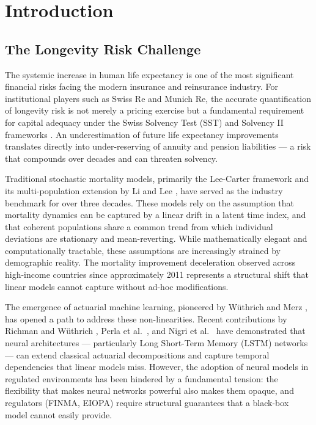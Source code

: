 \documentclass[11pt,a4paper]{article}
\begin{document}

\section{Introduction}

\subsection{The Longevity Risk Challenge}

The systemic increase in human life expectancy is one of the most significant financial risks facing the modern insurance and reinsurance industry. For institutional players such as Swiss Re and Munich Re, the accurate quantification of longevity risk is not merely a pricing exercise but a fundamental requirement for capital adequacy under the Swiss Solvency Test (SST) and Solvency II frameworks \cite{swissre2022}. An underestimation of future life expectancy improvements translates directly into under-reserving of annuity and pension liabilities --- a risk that compounds over decades and can threaten solvency.

Traditional stochastic mortality models, primarily the Lee-Carter framework \cite{leecarter1992} and its multi-population extension by Li and Lee \cite{lilee2005}, have served as the industry benchmark for over three decades. These models rely on the assumption that mortality dynamics can be captured by a linear drift in a latent time index, and that coherent populations share a common trend from which individual deviations are stationary and mean-reverting. While mathematically elegant and computationally tractable, these assumptions are increasingly strained by demographic reality. The mortality improvement deceleration observed across high-income countries since approximately 2011 represents a structural shift that linear models cannot capture without ad-hoc modifications.

The emergence of actuarial machine learning, pioneered by W\"uthrich and Merz \cite{wuthrich2021statistical, wuthrich2023}, has opened a path to address these non-linearities. Recent contributions by Richman and W\"uthrich \cite{richman2021}, Perla et al.\ \cite{perla2021}, and Nigri et al.\ \cite{nigri2019} have demonstrated that neural architectures --- particularly Long Short-Term Memory (LSTM) networks --- can extend classical actuarial decompositions and capture temporal dependencies that linear models miss. However, the adoption of neural models in regulated environments has been hindered by a fundamental tension: the flexibility that makes neural networks powerful also makes them opaque, and regulators (FINMA, EIOPA) require structural guarantees that a black-box model cannot easily provide.
\end{document}
